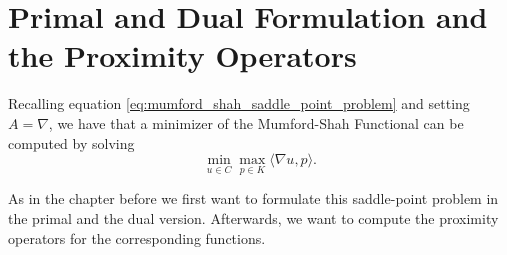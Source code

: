 \section{Primal and Dual Formulation and the Proximity Operators} %
\label{sub:the_mumford_shah_model_as_saddle_point_problem}

	Recalling equation \ref{eq:mumford_shah_saddle_point_problem} and setting $A = \nabla$, we have that a minimizer of the Mumford-Shah Functional can be computed by solving
		\begin{equation}
			\min_{u \in C} \max_{p \in K} \langle \nabla u, p \rangle.
			\label{eq:primal_dual_mumford_shah}
		\end{equation}

	As in the chapter before we first want to formulate this saddle-point problem in the primal and the dual version. Afterwards, we want to compute the proximity operators for the corresponding functions.

